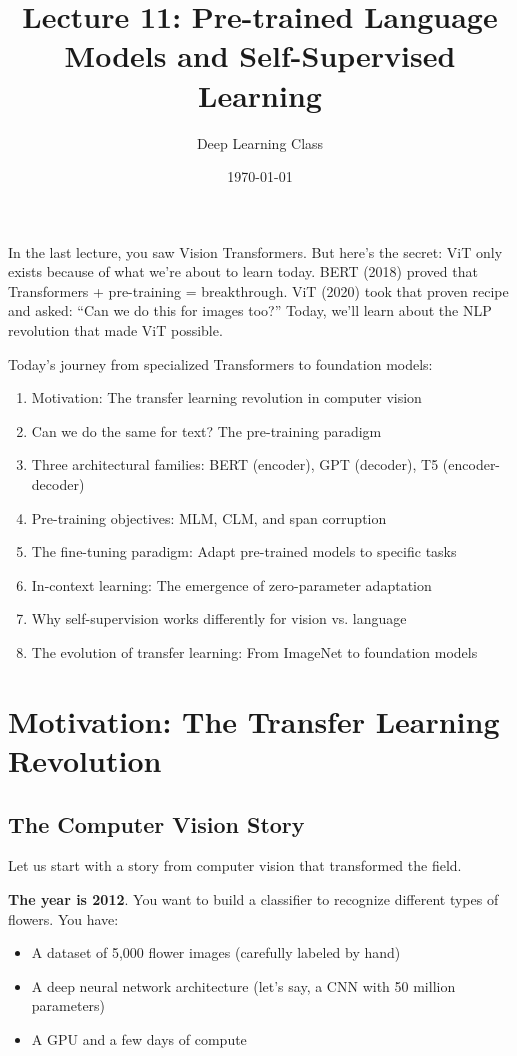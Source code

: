 \documentclass{article}
\title{Lecture 11: Pre-trained Language Models and Self-Supervised Learning}
\author{Deep Learning Class}
\date{\today}
\begin{document}
\maketitle

In the last lecture, you saw Vision Transformers. But here's the secret: ViT only exists because of what we're about to learn today. BERT (2018) proved that Transformers + pre-training = breakthrough. ViT (2020) took that proven recipe and asked: ``Can we do this for images too?'' Today, we'll learn about the NLP revolution that made ViT possible.

\begin{tcolorbox}[colback=blue!5!white, colframe=blue!75!black, title=Lecture Arc]
Today's journey from specialized Transformers to foundation models:

\begin{enumerate}
\item Motivation: The transfer learning revolution in computer vision
\item Can we do the same for text? The pre-training paradigm
\item Three architectural families: BERT (encoder), GPT (decoder), T5 (encoder-decoder)
\item Pre-training objectives: MLM, CLM, and span corruption
\item The fine-tuning paradigm: Adapt pre-trained models to specific tasks
\item In-context learning: The emergence of zero-parameter adaptation
\item Why self-supervision works differently for vision vs. language
\item The evolution of transfer learning: From ImageNet to foundation models
\end{enumerate}
\end{tcolorbox}

\section{Motivation: The Transfer Learning Revolution}

\subsection{The Computer Vision Story}

Let us start with a story from computer vision that transformed the field.

\textbf{The year is 2012}. You want to build a classifier to recognize different types of flowers. You have:
\begin{itemize}
\item A dataset of 5,000 flower images (carefully labeled by hand)
\item A deep neural network architecture (let's say, a CNN with 50 million parameters)
\item A GPU and a few days of compute
\end{itemize}
\end{document}
